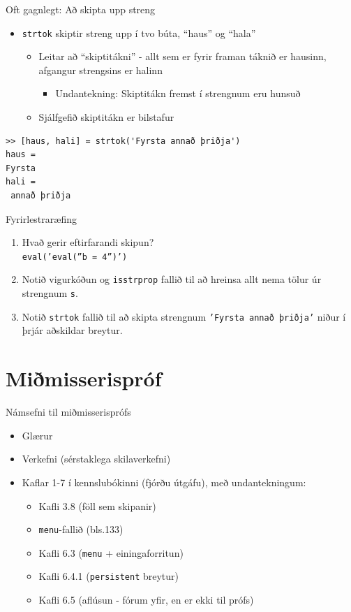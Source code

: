 \documentclass[handout]{beamer}
\begin{document}
\begin{frame}[fragile]{Oft gagnlegt: Að skipta upp streng}
\begin{itemize}
  \item \texttt{strtok} skiptir streng upp í tvo búta, ``haus'' og ``hala''
  \begin{itemize}
   \item Leitar að ``skiptitákni'' - allt sem er fyrir framan táknið er hausinn, afgangur strengsins er halinn
   \begin{itemize}
       \item Undantekning: Skiptitákn fremst í strengnum eru hunsuð
   \end{itemize}
   \item Sjálfgefið skiptitákn er bilstafur
  \end{itemize}
\end{itemize}
\begin{verbatim}
>> [haus, hali] = strtok('Fyrsta annað þriðja')
haus =
Fyrsta
hali =
 annað þriðja
\end{verbatim}

\end{frame}


\begin{frame}{Fyrirlestraræfing}
    \begin{enumerate}
        \item Hvað gerir eftirfarandi skipun?\\
        \texttt{eval('eval(''b = 4'')')}
        \item Notið vigurkóðun og \texttt{isstrprop} fallið til að hreinsa allt nema tölur úr strengnum \texttt{s}.
        \item Notið \texttt{strtok} fallið til að skipta strengnum \texttt{'Fyrsta annað þriðja'} niður í þrjár aðskildar breytur.
    \end{enumerate}
\end{frame}

\section{Miðmisserispróf}

\begin{frame}{Námsefni til miðmisserisprófs}
\begin{itemize}
 \item Glærur
 \item Verkefni (sérstaklega skilaverkefni)
 \item Kaflar 1-7 í kennslubókinni (fjórðu útgáfu), með undantekningum:
 \begin{itemize}
  \item Kafli 3.8 (föll sem skipanir)
  \item \texttt{menu}-fallið (bls.133)
  \item Kafli 6.3 (\texttt{menu} + einingaforritun)
  \item Kafli 6.4.1 (\texttt{persistent} breytur)
  \item Kafli 6.5 (aflúsun - fórum yfir, en er ekki til prófs)
 \end{itemize}
\end{itemize}
\end{frame}
\end{document}
